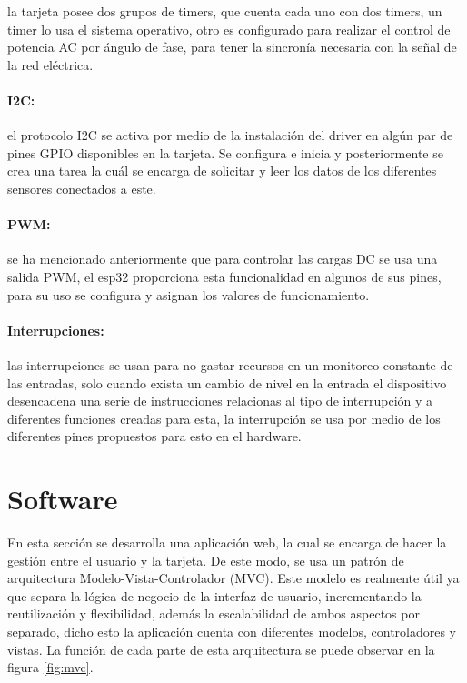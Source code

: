 la tarjeta posee dos grupos de timers, que cuenta cada uno con dos timers, un timer lo usa el sistema operativo, otro es configurado para realizar el control de potencia AC por ángulo de fase, para tener la sincronía necesaria con la señal de la red eléctrica.

\paragraph{I2C:}

el protocolo I2C se activa por medio de la instalación del driver en algún par de pines GPIO disponibles en la tarjeta. Se configura e inicia y posteriormente se crea una tarea la cuál se encarga de solicitar y leer los datos de los diferentes sensores conectados a este.

\paragraph{PWM:}

se ha mencionado anteriormente que para controlar las cargas DC se usa una salida PWM, el esp32 proporciona esta funcionalidad en algunos de sus pines, para su uso se configura y asignan los valores de funcionamiento.

\paragraph{Interrupciones:}

las interrupciones se usan para no gastar recursos en un monitoreo constante de las entradas, solo cuando exista un cambio de nivel en la entrada el dispositivo desencadena una serie de instrucciones relacionas al tipo de interrupción y a diferentes funciones creadas para esta, la interrupción se usa por medio de los diferentes pines propuestos para esto en el hardware.

\section{Software}

En esta sección se desarrolla una aplicación web, la cual se encarga de hacer la gestión entre el usuario y la tarjeta. De este modo, se usa un patrón de arquitectura Modelo-Vista-Controlador (MVC). Este modelo es realmente útil ya que separa la lógica de negocio de la interfaz de usuario, incrementando la reutilización y flexibilidad, además la escalabilidad de ambos aspectos por separado, dicho esto la aplicación cuenta con diferentes modelos, controladores y vistas. La función de cada parte de esta arquitectura se puede observar en la figura \ref{fig:mvc}.\\

